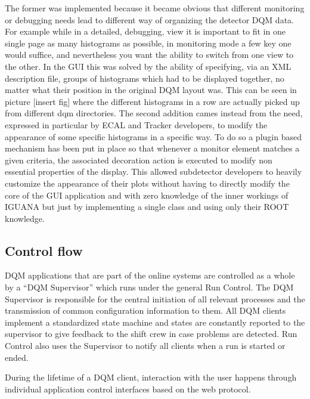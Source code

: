 \documentclass[a4paper]{cmspaper}
\begin{document}
The former was implemented because it became obvious that different monitoring or debugging needs lead to different way of organizing the detector DQM data. For example while in a detailed, debugging, view it is important to fit in one single page as many histograms as possible, in monitoring mode a few key one would suffice, and nevertheless you want the ability to switch from one view to the other. In the GUI this was solved by the ability of specifying, via an XML description file, groups of histograms which had to be displayed together, no matter what their position in the original DQM layout was. This can be seen in picture [insert fig] where the different histograms in a row are actually picked up from different dqm directories.
The second addition cames instead from the need, expressed in particular by ECAL and Tracker developers, to modify the appearance of some specific histograms in a specific way. To do so a plugin based mechanism has been put in place so that whenever a monitor element matches a given criteria, the associated decoration action is executed to modify non essential properties of the display. This allowed subdetector developers to heavily customize the appearance of their plots without having to directly modify the core of the GUI application and with zero knowledge of the inner workings of IGUANA but just by implementing a single class and using only their ROOT knowledge.


%
%
%

\subsection{Control flow}

DQM applications that are part of the online systems are controlled as a
whole by a ``DQM Supervisor'' which runs under the general Run Control.
The DQM Supervisor is responsible for the central initiation of all relevant processes and the
transmission of common configuration information to them. All DQM clients implement a standardized
state machine and states are constantly reported to the supervisor
to give feedback to the shift crew in case problems are detected.
Run Control also uses the Supervisor to notify all clients when a run is started or
ended.

During the lifetime of a DQM client, interaction with the user happens through individual
application control interfaces based on the web protocol.



\end{document}
